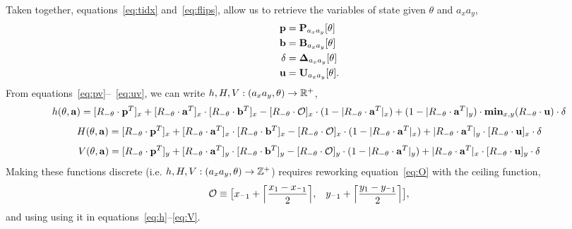 Taken together, equations~\ref{eq:tidx} and~\ref{eq:flips}, allow us to retrieve the variables
 of state given $\theta$ and $a_xa_y$,
\begin{eqnarray}
    \mathbf{p} &= \mathbf{P}_{a_xa_y}[\theta] \label{eq:pv} \\
    \mathbf{b} &= \mathbf{B}_{a_xa_y}[\theta]\\
    \delta &= \mathbf{\Delta}_{a_xa_y}[\theta]\\
    \mathbf{u} &= \mathbf{U}_{a_xa_y}[\theta]. \label{eq:uv}
\end{eqnarray}
From equations~\ref{eq:pv}--~\ref{eq:uv}, we can write $h,H,V: (a_xa_y,\theta) \rightarrow \mathbb{R}^+$,
\begin{equation}
    h(\theta,\av) = [\rnt \cdot \pv^T]_x + [\rnt \cdot \av^T]_x \cdot [\rnt \cdot \bv^T]_x -
    [\rnt \cdot \orig]_x \cdot (1 - |\rnt \cdot \av^T|_x) +
    (1 - |\rnt \cdot \av^T|_y) \cdot \mathbf{min}_{x,y}(\rnt \cdot \uv ) \cdot \delta
    \label{eq:h}
\end{equation}
\begin{equation}
    H(\theta,\av) = [\rnt \cdot \pv^T]_x + [\rnt \cdot \av^T]_x \cdot [\rnt \cdot \bv^T]_x -
    [\rnt \cdot \orig]_x \cdot (1 - |\rnt \cdot \av^T|_x) +
    |\rnt \cdot \av^T|_y \cdot [\rnt \cdot \uv ]_x \cdot \delta
    \label{eq:H}
\end{equation}
\begin{equation}
    V(\theta,\av) = [\rnt \cdot \pv^T]_y + [\rnt \cdot \av^T]_y \cdot [\rnt \cdot \bv^T]_y -
    [\rnt \cdot \orig]_y \cdot (1 - |\rnt \cdot \av^T|_y) +
    |\rnt \cdot \av^T|_x \cdot [\rnt \cdot \uv ]_y \cdot \delta
    \label{eq:V}
\end{equation}
Making these functions discrete (i.e. $h,H,V: (a_xa_y,\theta) \rightarrow \mathbb{Z}^+$)
requires reworking equation~\ref{eq:O} with the ceiling function,
\begin{equation}
    \mathcal{O} \equiv \bigl[x_{^-1} + \ceil[\Big]{\frac{x_1 - x_{^-1}}{2}}, \;\;\;
                             y_{^-1} + \ceil[\Big]{\frac{y_1 - y_{^-1}}{2}} \bigl],
    \label{eq:discreteO}
\end{equation}
and using using it in equations~\eqref{eq:h}--\eqref{eq:V}.

